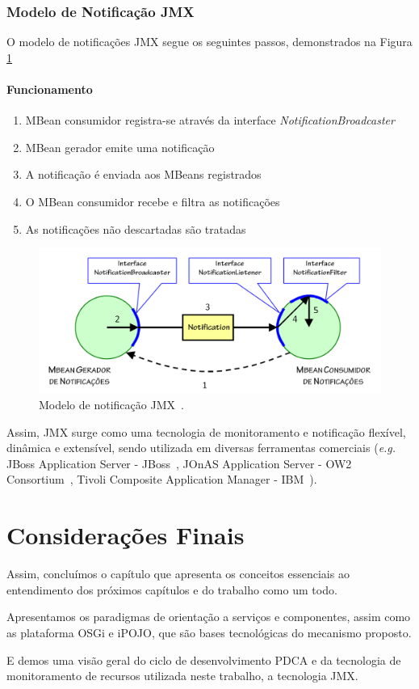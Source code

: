 \subsubsection{Modelo de Notificação JMX}
O modelo de notificações JMX segue os seguintes passos, demonstrados na Figura \ref{fig:notifyjmx}

\paragraph{Funcionamento} 
\begin{enumerate}
\item MBean consumidor registra-se através da interface \textit{NotificationBroadcaster}

\item MBean gerador emite uma notificação

\item A notificação é enviada aos MBeans registrados

\item O MBean consumidor recebe e filtra as notificações

\item As notificações não descartadas são tratadas
\end{enumerate}

\begin{figure}[htp]
\centering
\includegraphics[width=13cm]{chapters/chapter2/notification_model.png}
\caption[Modelo de notificação JMX]{Modelo de notificação JMX~\cite{pericasgerencia}.}
\label{fig:notifyjmx}
\end{figure}

Assim, JMX surge como uma tecnologia de monitoramento e notificação flexível, dinâmica e extensível, sendo utilizada em diversas ferramentas comerciais (\textit{e.g. } JBoss Application Server - JBoss~\cite{jboss}, JOnAS Application Server - OW2 Consortium~\cite{jonas}, Tivoli Composite Application Manager - IBM~\cite{tivoli}). 

\section{Considerações Finais}
Assim, concluímos o capítulo que apresenta os conceitos essenciais ao entendimento dos próximos capítulos e do trabalho como um todo.

Apresentamos os paradigmas de orientação a serviços e componentes, assim como as plataforma OSGi e iPOJO, que são bases tecnológicas do mecanismo proposto. 

E demos uma visão geral do ciclo de desenvolvimento PDCA e da tecnologia de monitoramento de recursos utilizada neste trabalho, a tecnologia JMX.
